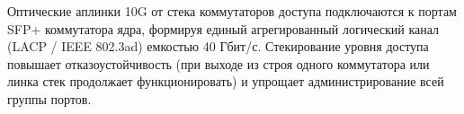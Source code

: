 \documentclass{bmstu}
\begin{document}
\begin{appendices}
\begin{figure}[H]
{
}
\end{figure}

\vspace{1cm}
\noindent Оптические аплинки 10G от стека коммутаторов доступа подключаются к портам SFP+ коммутатора ядра, формируя единый агрегированный логический канал (LACP / IEEE 802.3ad) емкостью 40 Гбит/с. Стекирование уровня доступа повышает отказоустойчивость (при выходе из строя одного коммутатора или линка стек продолжает функционировать) и упрощает администрирование всей группы портов.

\end{appendices}
\end{document}
